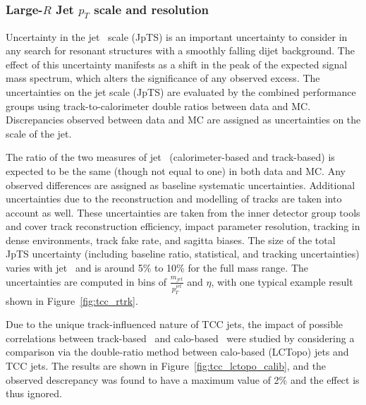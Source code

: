 \subsubsection{Large-$R$ Jet $p_T$ scale and resolution}
Uncertainty in the jet \pt\ scale (JpTS) is an important uncertainty to consider in any search for resonant structures with a smoothly falling dijet background.
The effect of this uncertainty manifests as a shift in the peak of the expected signal mass spectrum, which alters the significance of any observed excess.
The uncertainties on the jet \pt scale (JpTS) are evaluated by the combined performance groups using track-to-calorimeter double ratios between data and MC.
Discrepancies observed between data and MC are assigned as uncertainties on the \pt scale of the jet.

The ratio of the two measures of jet \pt\ (calorimeter-based and track-based) is expected to be the same (though not equal to one) in both data and MC.
Any observed differences are assigned as baseline systematic uncertainties.
Additional uncertainties due to the reconstruction and modelling of tracks are taken into account as well.
These uncertainties are taken from the inner detector group tools and cover track reconstruction efficiency, impact parameter resolution, tracking in dense environments, track fake rate, and sagitta biases.
The size of the total JpTS uncertainty (including baseline ratio, statistical, and tracking uncertainties) varies with jet \pt\ and is around 5\% to 10\% for the full mass range.
The uncertainties are computed in bins of $\frac{m_{jet}}{p_T^{jet}}$ and $\eta$, with one typical example result shown in Figure~\ref{fig:tcc_rtrk}.

Due to the unique track-influenced nature of TCC jets, the impact of possible correlations between track-based \pt\ and calo-based \pt\ were studied by considering a comparison via the double-ratio method between calo-based (LCTopo) jets and TCC jets.
The results are shown in Figure~\ref{fig:tcc_lctopo_calib}, and the observed descrepancy was found to have a maximum value of 2\% and the effect is thus ignored.

